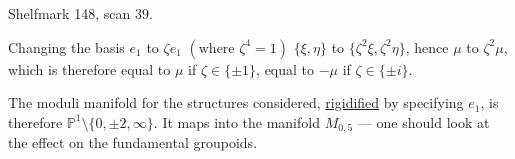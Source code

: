Shelfmark 148, scan 39.

Changing the basis $e_1$ to $\zeta e_1$ $(\text{where }\zeta^4=1)$
 
$\{\xi,\eta\}$ to $\{\zeta^2\xi,\zeta^2\eta\}$, hence $\mu$ to
$\zeta^2\mu$, which is therefore equal to $\mu$ if $\zeta\in\{\pm1\}$,
equal to $-\mu$ if $\zeta\in\{\pm i\}$.

The moduli manifold for the structures considered,
\uline{rigidified} by specifying $e_1$, is therefore
$\mathbb P^1\setminus\{0,\pm2,\infty\}$.
It maps into the manifold $M_{0,5}$ --- one should
look at the effect on the fundamental groupoids.
